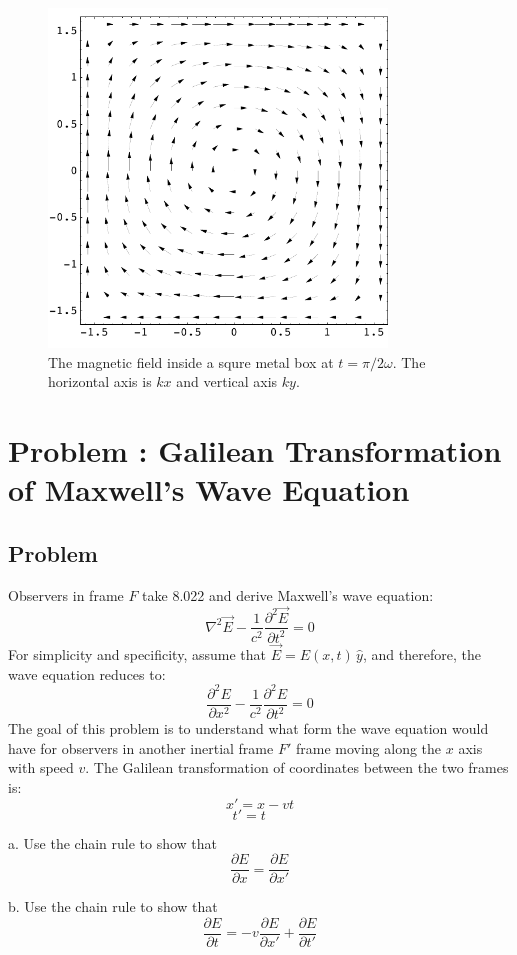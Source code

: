 \documentclass[solutions]{esg8022pset}
\begin{document}
\begin{figure}[H]
    \centering
    \includegraphics[width = 9cm]{em2}
    \caption{The magnetic field inside a squre metal box at
$t=\pi/2\omega$.  The horizontal axis is $kx$ and vertical axis $ky$.}
  \end{figure}

\section{Problem \thesection: Galilean Transformation of Maxwell's Wave Equation}
\subsection{Problem}

Observers in frame $F$ take 8.022 and derive Maxwell's wave equation:
$$\nabla^2\vec{E} - \frac{1}{c^2} \frac{\partial^2\vec{E}}{\partial t^2} = 0$$
For simplicity and specificity, assume that $\vec{E} = E(x,t)\, \hat{y}$, and therefore, the wave equation reduces to:
$$\frac{\partial^2E}{\partial x^2} - \frac{1}{c^2} \frac{\partial^2E}{\partial t^2} = 0$$
The goal of this problem is to understand what form the wave equation would have for observers in another inertial frame $F'$ frame moving along the $x$ axis with speed $v$.  The Galilean transformation of coordinates between the two frames is:
$$x' = x - vt$$
$$t' = t~~~~~~~$$


\noindent
a. Use the chain rule to show that
$$\frac{\partial E}{\partial x} = \frac{\partial E}{\partial x'}$$


\noindent
b. Use the chain rule to show that
$$\frac{\partial E}{\partial t} = -v \frac{\partial E}{\partial x'} + \frac{\partial E}{\partial t'}$$
\end{document}
